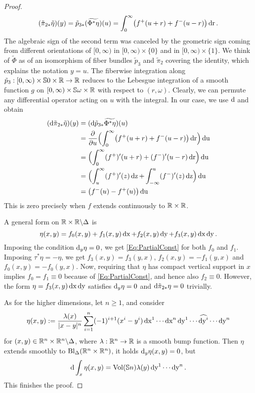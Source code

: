 \documentclass[\MainFolder/Text.tex]{subfiles}
\begin{document}
\begin{proof}
$$ (\tilde{\pi}_{2*}\tilde{\eta})(y) = \tilde{p}_{3*}(\widetilde{\Phi^*\eta})(u) = \int_0^\infty \bigl(f^+(u+r) + f^-(u-r) \bigr)\operatorname{dr}. $$
The algebraic sign of the second term was canceled by the geometric sign coming from different orientations of $[0,\infty)$ in $[0,\infty)\times\{0\}$ and in $[0,\infty)\times \{1\}$. We think of $\tilde{\Phi}$ as of an isomorphism of fiber bundles $\tilde{p}_3$ and $\tilde{\pi}_2$ covering the identity, which explains the notation $y=u$. The fiberwise integration along $\tilde{p}_3: [0,\infty) \times \mathbb{S}{0} \times
 \mathbb{R} \rightarrow \mathbb{R}$ reduces to the Lebesgue integration of a smooth function $g$ on $[0,\infty) \times \mathbb{S}{\omega} \times \mathbb{R}$ with respect to $(r,\omega)$. Clearly, we can permute any differential operator acting on $u$ with the integral.
 In our case, we use $\mathrm{d}$ and obtain
\begin{align*}
(\mathrm{d} \tilde{\pi}_{2*}\tilde{\eta})(y) &= (\mathrm{d} \tilde{p}_{3*}\widetilde{\Phi^*\eta})(u) \\
 &= \frac{\partial }{\partial u}\Bigl(\int_{0}^\infty \bigl(f^+(u+r)+f^-(u-r)\bigr) \operatorname{dr}\Bigr) \operatorname{du} \\
&= \Bigl(\int_0^\infty (f^+)'(u+r) + (f^-)'(u-r) \operatorname{dr}\Bigr)\operatorname{du} \\
& = \Bigl(\int_u^\infty (f^+)'(z) \operatorname{dz} + \int_{-\infty}^u (f^-)'(z) \operatorname{dz}\Bigr) \operatorname{du} \\
& = \bigl(f^-(u)- f^+(u)\bigr) \operatorname{du}
\end{align*}
This is zero precisely when $f$ extends continuously to $\mathbb{R} \times \mathbb{R}$.

A general form on $\mathbb{R}\times \mathbb{R}\backslash \Delta$ is 
$$ \eta(x,y) = f_0(x,y) + f_1(x,y) \operatorname{dx} + f_2(x,y) \operatorname{dy} + f_3(x,y) \operatorname{dx}\operatorname{dy}. $$
Imposing the condition $\mathrm{d}_y\eta= 0$, we get \eqref{Eq:PartialConst} for both $f_0$ and $f_1$.
Imposing $\tau^* \eta = - \eta$, we get $f_3(x,y) = f_3(y,x)$, $f_2(x,y) = - f_1(y,x)$ and $f_0(x,y) = - f_0(y,x)$.
Now, requiring that $\eta$ has compact vertical support in $x$ implies $f_0 = f_1 \equiv 0$ because of \eqref{Eq:PartialConst}, and hence also $f_2 \equiv 0$.
However, the form $\eta = f_3(x,y) \operatorname{dx} \operatorname{dy}$ satisfies $\mathrm{d}_y \eta = 0$ and $\mathrm{d}\tilde{\pi}_{2*}\eta = 0$ trivially.

As for the higher dimensions, let $n\ge 1$, and consider
\begin{equation*}
\eta(x,y) := \begin{multlined}[t]\frac{\lambda(x)}{\Abs{x-y}^n} \sum_{i=1}^n (-1)^{i+1}(x^i - y^i) \Diff{x}^1\dotsb\Diff{x}^n\Diff{y}^1\dotsb \widehat{\Diff{y}^i}\dotsb\Diff{y}^n\end{multlined}
\end{equation*}
for $(x,y)\in \mathbb{R}^n\times\mathbb{R}^n\backslash\Delta$, where $\lambda: \mathbb{R}^n \rightarrow \mathbb{R}$ is a smooth bump function. Then $\eta$ extends smoothly to $\mathrm{Bl}_\Delta(\mathbb{R}^n\times \mathbb{R}^n)$, it holds $\mathrm{d}_y \eta(x,y) = 0$, but 
$$ \mathrm{d} \int_x \eta(x,y) = \mathrm{Vol}(\mathbb{S}{n}) \lambda(y) \operatorname{dy}^1 \dotsb \operatorname{dy}^n. $$
This finishes the proof.
\end{proof}
\end{document}
